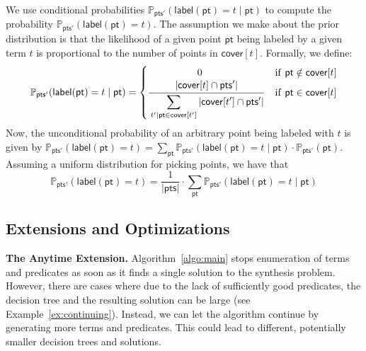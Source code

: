 \documentclass{llncs}
\newcommand\Points{\mathsf{pts}}
\newcommand\Point{\mathsf{pt}}
\newcommand\Term{t}
\newcommand\Cover{\mathsf{cover}}
\newcommand\Prob[2]{\mathbb{P}_{#1}(#2)}
\renewcommand{\paragraph}[1]{\par\noindent\textbf{#1.}}
\newcommand{\labl}[1]{\mathsf{label}(#1)}
\begin{document}
We use conditional probabilities $\Prob{\Points'}{\labl{\Point} = \Term \mid
\Point}$ to compute the probability $\Prob{\Points'}{\labl{\Point} = t}$.
The assumption we make about the prior distribution is that the
likelihood of a given point $\Point$ being labeled by a given term
$\Term$ is proportional to the number of points in $\Cover[\Term]$.
Formally, we define:
\[
    \Prob{\Points'}{\labl{\Point} = t \mid \Point} =
    \begin{cases}
        \qquad\qquad\quad 0  & \mathrm{if}\ \Point \notin \Cover[\Term]\\
      \displaystyle
      \frac{\strut\displaystyle\vert \Cover[\Term] \cap \Points' \vert}{\strut\displaystyle\sum_{\Term'
          | \Point \in \Cover[\Term']} \vert \Cover[\Term'] \cap \Points' \vert } & \mathrm{if}\
      \Point \in \Cover[\Term] \\
    \end{cases}
\]
Now, the unconditional probability of an arbitrary point being labeled
with $\Term$ is given by $\Prob{\Points'}{\labl{\Point} = \Term} = \sum_{\Point}
\Prob{\Points'}{\labl{\Point} = \Term \mid \Point}\cdot\Prob{\Points'}{\Point}$.
Assuming a uniform distribution for picking points, we have that
\[
    \Prob{\Points'}{\labl{\Point} = t} =  \frac{1}{\vert \Points \vert} \cdot \sum_{\Point} \Prob{\Points'}{\labl{\Point} = \Term \mid \Point}
\]


\subsection{Extensions and Optimizations}
\label{sec:optimizations}

\paragraph{The Anytime Extension}
Algorithm~\ref{algo:main} stops enumeration of terms and predicates as
soon as it finds a single solution to the synthesis problem.
However, there are cases where due to the lack of sufficiently good
predicates, the decision tree and the resulting solution can be large
(see Example~\ref{ex:continuing}).
Instead, we can let the algorithm continue by generating more
terms and predicates.
This could lead to different, potentially smaller decision trees and
solutions.
\end{document}
